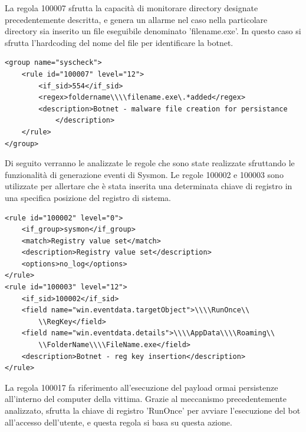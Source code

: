 La regola 100007 sfrutta la capacità di monitorare directory designate precedentemente descritta, e genera un allarme nel caso nella particolare directory sia inserito un file eseguibile denominato 'filename.exe'. In questo caso si sfrutta l'hardcoding del nome del file per identificare la botnet.
\begin{lstlisting}
<group name="syscheck">
    <rule id="100007" level="12">
        <if_sid>554</if_sid>
        <regex>foldername\\\\filename.exe\.*added</regex>
        <description>Botnet - malware file creation for persistance 
            </description>
    </rule>
</group>
\end{lstlisting}

Di seguito verranno le analizzate le regole che sono state realizzate sfruttando le funzionalità di generazione eventi di Sysmon.
Le regole 100002 e 100003 sono utilizzate per allertare che è stata inserita una determinata chiave di registro in una specifica posizione del registro di sistema. 

\begin{lstlisting}
<rule id="100002" level="0">
    <if_group>sysmon</if_group>
    <match>Registry value set</match>
    <description>Registry value set</description>
    <options>no_log</options>
</rule>
<rule id="100003" level="12">
    <if_sid>100002</if_sid>
    <field name="win.eventdata.targetObject">\\\\RunOnce\\
        \\RegKey</field>
    <field name="win.eventdata.details">\\\\AppData\\\\Roaming\\
        \\FolderName\\\\FileName.exe</field>
    <description>Botnet - reg key insertion</description>
</rule>

\end{lstlisting}

La regola 100017 fa riferimento all'esecuzione del payload ormai persistenze all'interno del computer della vittima. Grazie al meccanismo precedentemente analizzato, sfrutta la chiave di registro 'RunOnce' per avviare l'esecuzione del bot all'accesso dell'utente, e questa regola si basa su questa azione.


